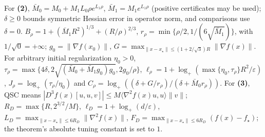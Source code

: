 \begin{table}[tp]
\begin{threeparttable}
\begin{tablenotes}[flushleft]
For \textbf{(2)}, $\bar M_0=M_0+M_1L_0\rho e^{L_1\rho}$, $\bar M_1=M_1e^{L_1\rho}$ (positive certificates may be used); $\delta\ge0$ bounds symmetric Hessian error in operator norm, and comparisons use $\delta=0$. $B_\rho=1+(\bar M_1R^2)^{1/3}+(R/\rho)^{2/3}$, $r_\rho=\min\{\rho/2,1/(6\sqrt{\bar M_1})\}$, with $1/\sqrt0=+\infty$; $g_0=\|\nabla f(x_0)\|$, $G=\max_{\|x-x_\star\|\le(1+2/\sqrt3)R}\|\nabla f(x)\|$. For arbitrary initial regularization $\eta_0>0$, $\tau_\rho=\max\{4\delta,2\sqrt{(\bar M_0+\bar M_1g_0)g_0},2g_0/\rho\}$, $\ell_\rho=1+\log_+(\max\{\eta_0,\tau_\rho\}R^2/\varepsilon)$, $J_\rho=\log_+(\tau_\rho/\eta_0)$ and $C_\rho=\log_+((\delta+G/r_\rho)/(\delta+\bar M_0r_\rho))$.
For \textbf{(3)}, QSC means $|D^3f(x)[u,u,v]|\le M\langle\nabla^2f(x)u,u\rangle\|v\|$; $R_D=\max\{R,2^{3/2}/M\}$, $\ell_D=1+\log_+(d/\varepsilon)$, $L_D=\max_{\|x-x_\star\|\le6R_D}\|\nabla^2f(x)\|$, $F_D=\max_{\|x-x_\star\|\le6R_D}(f(x)-f_\star)$; the theorem's absolute tuning constant is set to $1$.
\end{tablenotes}
\end{threeparttable}
\end{table}
\clearpage
